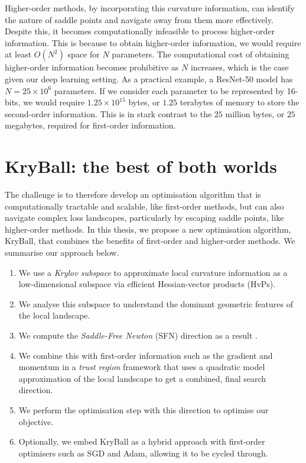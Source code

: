Higher-order methods, by incorporating this curvature information, can identify the nature of saddle points and navigate away from them more effectively. Despite this, it becomes computationally infeasible to process higher-order information. This is because to obtain higher-order information, we would require at least $O(N^2)$ space for $N$ parameters. The computational cost of obtaining higher-order information becomes prohibitive as $N$ increases, which is the case given our deep learning setting. As a practical example, a ResNet-50 model has $N = 25 \times 10^6$ parameters. If we consider each parameter to be represented by 16-bits, we would require $1.25 \times 10^{15}$ bytes, or $1.25$ terabytes of memory to store the second-order information. This is in stark contrast to the $25$ million bytes, or $25$ megabytes, required for first-order information.

\section{KryBall: the best of both worlds}
\label{sec:kryball_intro}

The challenge is to therefore develop an optimisation algorithm that is computationally tractable and scalable, like first-order methods, but can also navigate complex loss landscapes, particularly by escaping saddle points, like higher-order methods. In this thesis, we propose a new optimisation algorithm, KryBall, that combines the benefits of first-order and higher-order methods. We summarise our approach below.

\begin{enumerate}
  \item We use a \textit{Krylov subspace} to approximate local curvature information as a low-dimensional subspace via efficient Hessian-vector products (HvPs).
  \item We analyse this subspace to understand the dominant geometric features of the local landscape. 
  \item We compute the \textit{Saddle-Free Newton} (SFN) direction as a result \citep{dauphin2014sfn}.
  \item We combine this with first-order information such as the gradient and momentum in a \textit{trust region} framework that uses a quadratic model approximation of the local landscape to get a combined, final search direction.
  \item We perform the optimisation step with this direction to optimise our objective.
  \item Optionally, we embed KryBall as a hybrid approach with first-order optimisers such as SGD and Adam, allowing it to be cycled through.
\end{enumerate}


